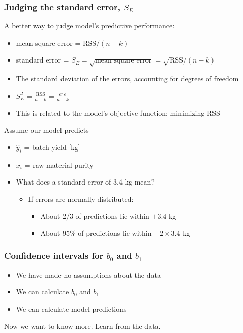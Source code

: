\begin{frame}\frametitle{Judging the standard error, $S_E$}

	A better way to judge model's predictive performance:
	\begin{itemize}
		\item	mean square error = $\text{RSS}/(n-k)$
		\item	standard error = $S_E = \sqrt{\text{mean square error}} = \sqrt{\text{RSS}/(n-k)}$
		\item	The standard deviation of the errors, accounting for degrees of freedom
		\item	$S_E^2 = \frac{\displaystyle \text{RSS}}{\displaystyle n-k} = \frac{e^Te}{\displaystyle n-k}$
		\item	This is related to the model's objective function: minimizing RSS
	\end{itemize}

	Assume our model predicts
	\begin{itemize}
		\item	$\hat{y}_i$ = batch yield [kg]
		\item	$x_i$ = raw material purity
		\item	What does a standard error of 3.4 kg mean?
		\begin{itemize}
			\item	If errors are normally distributed:
			\begin{itemize}
				\item	About 2/3 of predictions lie within $\pm 3.4$ kg
				\item	About 95\% of predictions lie within $\pm 2 \times 3.4$ kg
			\end{itemize}
		\end{itemize}
	\end{itemize}
\end{frame}

\begin{frame}\frametitle{Confidence intervals for $b_0$ and $b_1$}
	\begin{itemize}
		\item	We have made no assumptions about the data
		\item	We can calculate $b_0$ and $b_1$
		\item	We can calculate model predictions
	\end{itemize}

	Now we want to know more. Learn from the data.
\end{frame}


